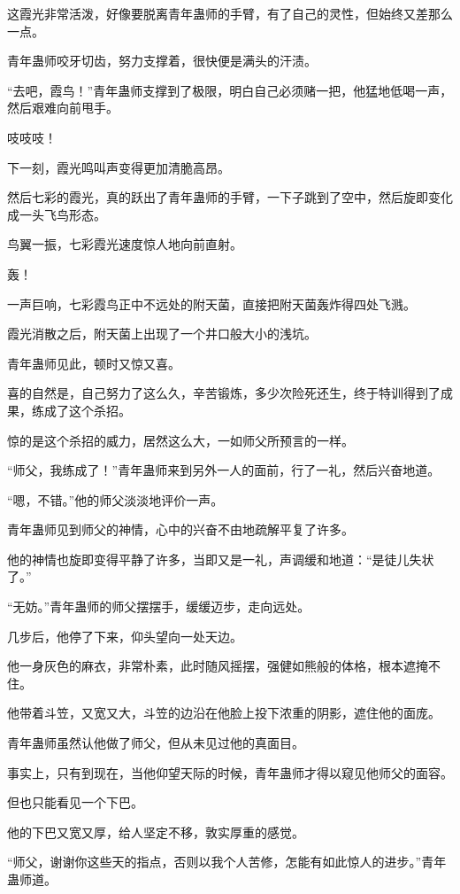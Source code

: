 \begin{this_body}
这霞光非常活泼，好像要脱离青年蛊师的手臂，有了自己的灵性，但始终又差那么一点。

青年蛊师咬牙切齿，努力支撑着，很快便是满头的汗渍。

“去吧，霞鸟！”青年蛊师支撑到了极限，明白自己必须赌一把，他猛地低喝一声，然后艰难向前甩手。

吱吱吱！

下一刻，霞光鸣叫声变得更加清脆高昂。

然后七彩的霞光，真的跃出了青年蛊师的手臂，一下子跳到了空中，然后旋即变化成一头飞鸟形态。

鸟翼一振，七彩霞光速度惊人地向前直射。

轰！

一声巨响，七彩霞鸟正中不远处的附天菌，直接把附天菌轰炸得四处飞溅。

霞光消散之后，附天菌上出现了一个井口般大小的浅坑。

青年蛊师见此，顿时又惊又喜。

喜的自然是，自己努力了这么久，辛苦锻炼，多少次险死还生，终于特训得到了成果，练成了这个杀招。

惊的是这个杀招的威力，居然这么大，一如师父所预言的一样。

“师父，我练成了！”青年蛊师来到另外一人的面前，行了一礼，然后兴奋地道。

“嗯，不错。”他的师父淡淡地评价一声。

青年蛊师见到师父的神情，心中的兴奋不由地疏解平复了许多。

他的神情也旋即变得平静了许多，当即又是一礼，声调缓和地道：“是徒儿失状了。”

“无妨。”青年蛊师的师父摆摆手，缓缓迈步，走向远处。

几步后，他停了下来，仰头望向一处天边。

他一身灰色的麻衣，非常朴素，此时随风摇摆，强健如熊般的体格，根本遮掩不住。

他带着斗笠，又宽又大，斗笠的边沿在他脸上投下浓重的阴影，遮住他的面庞。

青年蛊师虽然认他做了师父，但从未见过他的真面目。

事实上，只有到现在，当他仰望天际的时候，青年蛊师才得以窥见他师父的面容。

但也只能看见一个下巴。

他的下巴又宽又厚，给人坚定不移，敦实厚重的感觉。

“师父，谢谢你这些天的指点，否则以我个人苦修，怎能有如此惊人的进步。”青年蛊师道。


\end{this_body}
